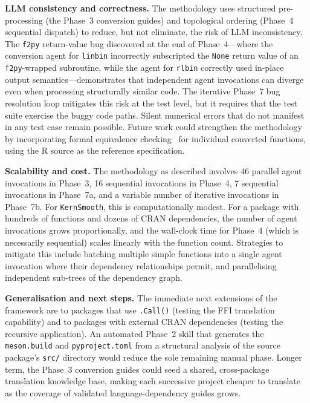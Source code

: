 \documentclass[12pt,a4paper]{article}
\newcommand{\pkg}[1]{\texttt{#1}}
\begin{document}
\textbf{LLM consistency and correctness.} The methodology uses structured pre-processing (the Phase~3 conversion guides) and topological ordering (Phase~4 sequential dispatch) to reduce, but not eliminate, the risk of LLM inconsistency. The \pkg{f2py} return-value bug discovered at the end of Phase~4---where the conversion agent for \texttt{linbin} incorrectly subscripted the \texttt{None} return value of an \pkg{f2py}-wrapped subroutine, while the agent for \texttt{rlbin} correctly used in-place output semantics---demonstrates that independent agent invocations can diverge even when processing structurally similar code. The iterative Phase~7 bug resolution loop mitigates this risk at the test level, but it requires that the test suite exercise the buggy code paths. Silent numerical errors that do not manifest in any test case remain possible. Future work could strengthen the methodology by incorporating formal equivalence checking~\cite{bhatia2024} for individual converted functions, using the R source as the reference specification.

\textbf{Scalability and cost.} The methodology as described involves 46 parallel agent invocations in Phase~3, 16 sequential invocations in Phase~4, 7 sequential invocations in Phase~7a, and a variable number of iterative invocations in Phase~7b. For \pkg{KernSmooth}, this is computationally modest. For a package with hundreds of functions and dozens of CRAN dependencies, the number of agent invocations grows proportionally, and the wall-clock time for Phase~4 (which is necessarily sequential) scales linearly with the function count. Strategies to mitigate this include batching multiple simple functions into a single agent invocation where their dependency relationships permit, and parallelising independent sub-trees of the dependency graph.

\textbf{Generalisation and next steps.} The immediate next extensions of the framework are to packages that use \texttt{.Call()} (testing the FFI translation capability) and to packages with external CRAN dependencies (testing the recursive application). An automated Phase~2 skill that generates the \texttt{meson.build} and \texttt{pyproject.toml} from a structural analysis of the source package's \texttt{src/} directory would reduce the sole remaining manual phase. Longer term, the Phase~3 conversion guides could seed a shared, cross-package translation knowledge base, making each successive project cheaper to translate as the coverage of validated language-dependency guides grows.
\end{document}
